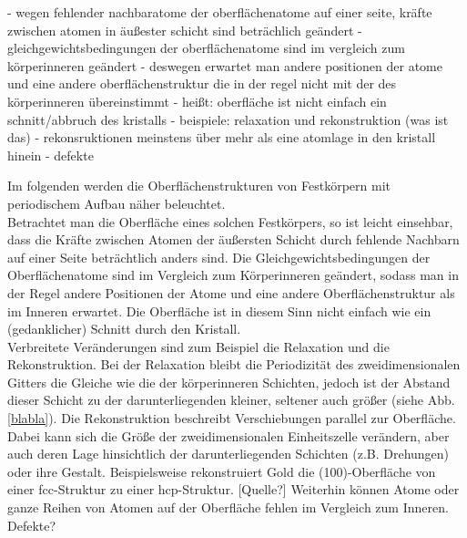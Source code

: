 - wegen fehlender nachbaratome der oberflächenatome auf einer seite, kräfte zwischen atomen in äußester
 schicht sind beträchlich geändert
 - gleichgewichtsbedingungen der oberflächenatome sind im vergleich zum körperinneren geändert
 - deswegen erwartet man andere positionen der atome und eine andere oberflächenstruktur die in der regel
 nicht mit der des körperinneren übereinstimmt
 - heißt: oberfläche ist nicht einfach ein schnitt/abbruch des kristalls
 - beispiele: relaxation und rekonstruktion (was ist das)
 - rekonsruktionen meinstens über mehr als eine atomlage in den kristall hinein 
 - defekte
 
 Im folgenden werden die Oberflächenstrukturen von Festkörpern mit periodischem Aufbau näher
 beleuchtet. \\
 Betrachtet man die Oberfläche eines solchen Festkörpers, so ist leicht einsehbar, dass die
 Kräfte zwischen Atomen der äußersten Schicht durch fehlende Nachbarn auf einer Seite beträchtlich
 anders sind. Die Gleichgewichtsbedingungen der Oberflächenatome sind im Vergleich zum
 Körperinneren geändert, sodass man in der Regel andere Positionen der Atome und eine andere Oberflächenstruktur
 als im Inneren erwartet. Die Oberfläche ist in diesem Sinn nicht einfach wie ein (gedanklicher)
 Schnitt durch den Kristall.\\
 Verbreitete Veränderungen sind zum Beispiel die Relaxation und die Rekonstruktion. Bei der
 Relaxation bleibt die Periodizität des zweidimensionalen Gitters die Gleiche wie die der
 körperinneren Schichten, jedoch ist der Abstand dieser Schicht zu der
 darunterliegenden kleiner, seltener auch größer (siehe Abb. \ref{blabla}). Die Rekonstruktion
 beschreibt Verschiebungen parallel zur Oberfläche. Dabei kann sich die Größe der
 zweidimensionalen Einheitszelle verändern, aber auch deren Lage hinsichtlich der darunterliegenden
 Schichten (z.B. Drehungen) oder ihre Gestalt.  Beispielsweise rekonstruiert Gold die
 (100)-Oberfläche von einer fcc-Struktur zu einer hcp-Struktur. [Quelle?] Weiterhin können Atome
 oder ganze Reihen von Atomen auf der Oberfläche fehlen im Vergleich zum Inneren. \\
 Defekte?
\\

 
